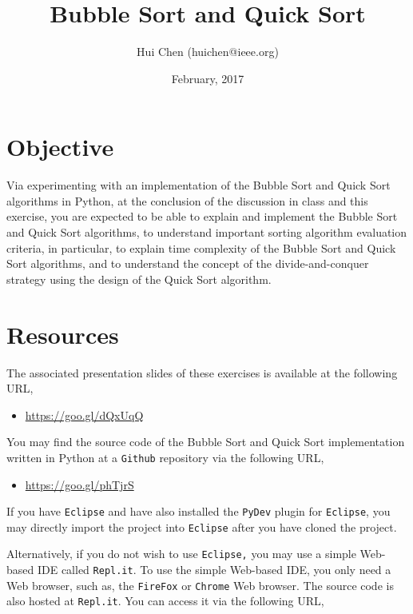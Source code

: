 \documentclass[11pt,letterpaper]{article}
\title{Bubble Sort and Quick Sort}
\author{Hui Chen (huichen@ieee.org)}
\date{February, 2017}
\begin{document}
\maketitle
\thispagestyle{firstpage}

\section{Objective}
Via experimenting with an implementation of the Bubble Sort and Quick Sort
algorithms in Python, at the conclusion of the discussion in class and this
exercise, you are expected to be able to explain and implement the Bubble Sort
and Quick Sort algorithms, to understand important sorting algorithm evaluation
criteria, in particular, to explain time complexity of the Bubble Sort and
Quick Sort algorithms, and to understand the concept of the divide-and-conquer
strategy using the design of the Quick Sort algorithm.

\section{Resources}

The associated presentation slides of these exercises is available at the
following URL,

\begin{itemize}
    \item \url{https://goo.gl/dQxUqQ}
\end{itemize}


You may find the source code of the Bubble Sort and Quick Sort implementation
written in Python at a \texttt{Github} repository via the following URL,

\begin{itemize}
    \item \url{https://goo.gl/phTjrS}
\end{itemize}

\noindent If you have \texttt{Eclipse} and have also installed the
\texttt{PyDev} plugin for \texttt{Eclipse}, you may directly import the project
into \texttt{Eclipse} after you have cloned the project. 

Alternatively, if you do not wish to use \texttt{Eclipse,} you may use a simple
Web-based IDE called \texttt{Repl.it}. To use the simple Web-based IDE, you
only need a Web browser, such as, the \texttt{FireFox} or \texttt{Chrome} Web
browser. The source code is also hosted at \texttt{Repl.it}.  You can access it
via the following URL,
\end{document}
